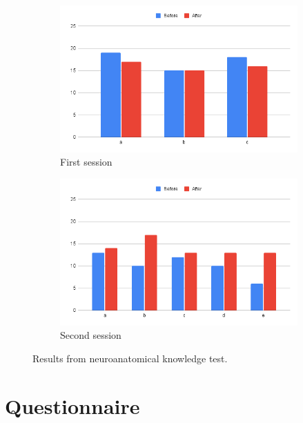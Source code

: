 \begin{figure}[H]
    \centering
    \begin{subfigure}[t]{0.8\textwidth}
        \includegraphics[width=\textwidth]{fig/knowtestresult1}
        \caption{First session}
    \end{subfigure}
    \begin{subfigure}[b]{0.8\textwidth}
        \includegraphics[width=\textwidth]{fig/knowtestresult2}
        \caption{Second session}
    \end{subfigure}
    \caption{Results from neuroanatomical knowledge test.}
    \label{fig:knowtestres}
\end{figure}





\section{Questionnaire}

